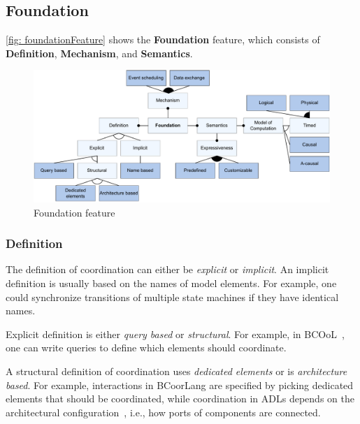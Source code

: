 \documentclass[runningheads]{llncs}
\begin{document}
\subsection{Foundation}

\autoref{fig: foundationFeature} shows the \textbf {Foundation} feature, which consists of \textbf{Definition}, \textbf{Mechanism}, and \textbf{Semantics}.

\begin{figure}[ht]
	\centering
	\includegraphics[width=1\textwidth]{images/coordination_feature}
	\caption{Foundation feature}
	\label{fig: foundationFeature}
\end{figure}

\subsubsection{Definition} The definition of coordination can either be \textit{explicit} or \textit{implicit}.
An implicit definition is usually based on the names of model elements.
For example, one could synchronize transitions of multiple state machines if they have identical names.

Explicit definition is either \textit{query based} or \textit{structural}.
For example, in BCOoL~\cite{varalarsenBCOolBehavioralCoordination2016,varalarsenBehavioralCoordinationOperator2015}, one can write queries to define which elements should coordinate.

A structural definition of coordination uses \textit{dedicated elements} or is \textit{architecture based}.
For example, interactions in BCoorLang are specified by picking dedicated elements that should be coordinated, while coordination in ADLs depends on the architectural configuration~\cite{medvidovicClassificationComparisonFramework2000}, i.e., how ports of components are connected.
\end{document}
